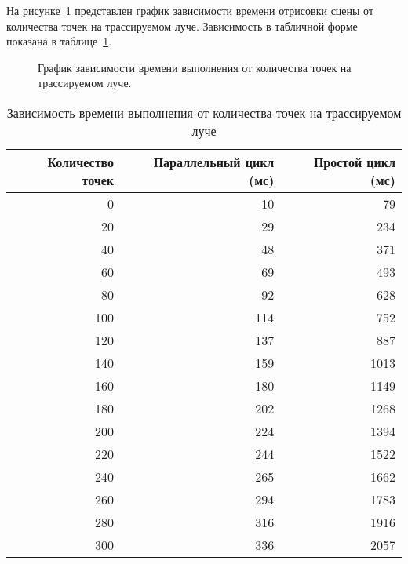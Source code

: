 На рисунке~\ref{fig:plot} представлен график зависимости времени отрисовки сцены от количества точек на трассируемом луче. Зависимость в табличной форме показана в таблице~\ref{tab:steps_time}.

\vspace{-5cm}
\begin{figure}[ht!]
	\centering
	   
	\caption{График зависимости времени выполнения от количества точек на трассируемом луче.}
	\label{fig:plot}
\end{figure}

\begin{table}
\caption{Зависимость времени выполнения от количества точек на трассируемом луче}
\begin{tabular}{|r|r|r|}
	\hline
	\textbf{Количество точек} & \textbf{Параллельный цикл (мс)} & \textbf{Простой цикл (мс)} \\ \hline
	0              & 10            & 79            \\ \hline
	20             & 29            & 234           \\ \hline
	40             & 48            & 371            \\ \hline
	60             & 69            & 493           \\ \hline
	80             & 92            & 628           \\ \hline
	100            & 114           & 752           \\ \hline
	120            & 137           & 887           \\ \hline
	140            & 159            & 1013          \\ \hline
	160            & 180           & 1149          \\ \hline
	180            & 202           & 1268          \\ \hline
	200            & 224             & 1394          \\ \hline
	220            & 244           & 1522          \\ \hline
	240            & 265           & 1662          \\ \hline
	260            & 294           & 1783          \\ \hline
	280            & 316            & 1916          \\ \hline
	300            & 336           & 2057          \\ \hline
\end{tabular}
\label{tab:steps_time}
\end{table}
\clearpage

